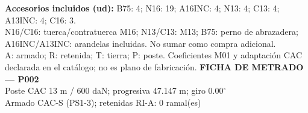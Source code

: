 \begingroup\scriptsize
\textbf{Accesorios incluidos (ud):} B75: 4; N16: 19; A16INC: 4; N13: 4; C13: 4; A13INC: 4; C16: 3.\\
N16/C16: tuerca/contratuerca M16; N13/C13: M13; B75: perno de abrazadera; A16INC/A13INC: arandelas incluidas. No sumar como compra adicional.\\
A: armado; R: retenida; T: tierra; P: poste. Coeficientes M01 y adaptación CAC declarada en el catálogo; no es plano de fabricación.
\endgroup\endgroup
\clearpage{}
\begingroup\small\setlength{\parskip}{3pt}\renewcommand{\arraystretch}{1.05}
\textbf{\large FICHA DE METRADO — P002}\\[4pt]
Poste CAC 13 m / 600 daN; progresiva 47.147 m; giro 0.00\ensuremath{^\circ}\\
Armado CAC-S (PS1-3); retenidas RI-A: 0 ramal(es)\\
\begingroup\scriptsize
